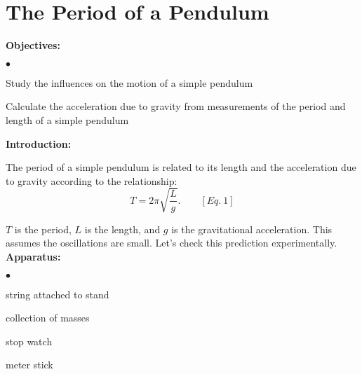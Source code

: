
\section{The Period of a Pendulum}

\makelabheader %

{\noindent \bf Objectives:} \begin{list}{$\bullet$}{\itemsep0pt }

\item Study the influences on the motion of a simple pendulum \item Calculate the acceleration due to gravity from measurements of the period and length of a simple pendulum

\end{list}

{\noindent \bf Introduction:}

\noindent The period of a simple pendulum is related to its length and the acceleration due to gravity according to the relationship:
\[
T=2\pi \sqrt{\frac{L}{g}}.\qquad [Eq.\: 1]\]

\noindent $T$ is the period, $L$ is the length, and $g$ is the gravitational acceleration. This assumes the oscillations are small. Let's check this prediction experimentally. \\

{\noindent \bf Apparatus:} \begin{list}{$\bullet$}{\itemsep0pt }

\item string attached to stand \item collection of masses \item stop watch \item meter stick

\end{list}

